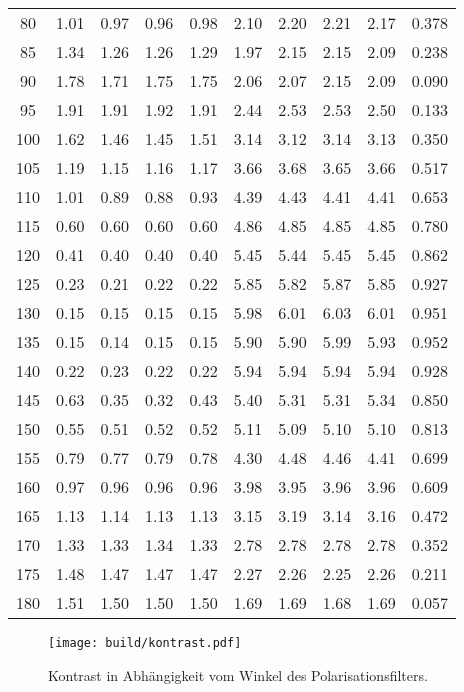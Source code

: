 \begin{sidewaystable}
\begin{tabular}{c c c c c c c c c c}
     80& 1.01 & 0.97 & 0.96 & 0.98 & 2.10 & 2.20 & 2.21 & 2.17 & 0.378 \\
     85& 1.34 & 1.26 & 1.26 & 1.29 & 1.97 & 2.15 & 2.15 & 2.09 & 0.238 \\
     90& 1.78 & 1.71 & 1.75 & 1.75 & 2.06 & 2.07 & 2.15 & 2.09 & 0.090 \\
     95& 1.91 & 1.91 & 1.92 & 1.91 & 2.44 & 2.53 & 2.53 & 2.50 & 0.133 \\
    100& 1.62 & 1.46 & 1.45 & 1.51 & 3.14 & 3.12 & 3.14 & 3.13 & 0.350 \\
    105& 1.19 & 1.15 & 1.16 & 1.17 & 3.66 & 3.68 & 3.65 & 3.66 & 0.517 \\
    110& 1.01 & 0.89 & 0.88 & 0.93 & 4.39 & 4.43 & 4.41 & 4.41 & 0.653 \\
    115& 0.60 & 0.60 & 0.60 & 0.60 & 4.86 & 4.85 & 4.85 & 4.85 & 0.780 \\
    120& 0.41 & 0.40 & 0.40 & 0.40 & 5.45 & 5.44 & 5.45 & 5.45 & 0.862 \\
    125& 0.23 & 0.21 & 0.22 & 0.22 & 5.85 & 5.82 & 5.87 & 5.85 & 0.927 \\
    130& 0.15 & 0.15 & 0.15 & 0.15 & 5.98 & 6.01 & 6.03 & 6.01 & 0.951 \\
    135& 0.15 & 0.14 & 0.15 & 0.15 & 5.90 & 5.90 & 5.99 & 5.93 & 0.952 \\
    140& 0.22 & 0.23 & 0.22 & 0.22 & 5.94 & 5.94 & 5.94 & 5.94 & 0.928 \\
    145& 0.63 & 0.35 & 0.32 & 0.43 & 5.40 & 5.31 & 5.31 & 5.34 & 0.850 \\
    150& 0.55 & 0.51 & 0.52 & 0.52 & 5.11 & 5.09 & 5.10 & 5.10 & 0.813 \\
    155& 0.79 & 0.77 & 0.79 & 0.78 & 4.30 & 4.48 & 4.46 & 4.41 & 0.699 \\
    160& 0.97 & 0.96 & 0.96 & 0.96 & 3.98 & 3.95 & 3.96 & 3.96 & 0.609 \\
    165& 1.13 & 1.14 & 1.13 & 1.13 & 3.15 & 3.19 & 3.14 & 3.16 & 0.472 \\
    170& 1.33 & 1.33 & 1.34 & 1.33 & 2.78 & 2.78 & 2.78 & 2.78 & 0.352 \\
    175& 1.48 & 1.47 & 1.47 & 1.47 & 2.27 & 2.26 & 2.25 & 2.26 & 0.211 \\
    180& 1.51 & 1.50 & 1.50 & 1.50 & 1.69 & 1.69 & 1.68 & 1.69 & 0.057 \\
    \bottomrule
    \end{tabular}
    \label{tab:kontrast}
\end{sidewaystable}

\begin{figure}
    \centering
    \texttt{[image: build/kontrast.pdf]}
    \caption{Kontrast in Abhängigkeit vom Winkel des Polarisationsfilters.}
    \label{fig:kontrast}
\end{figure}

